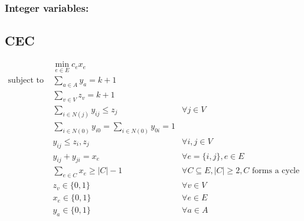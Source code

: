 \documentclass[11pt]{article}
\begin{document}
\subsubsection{Integer variables:}


\subsection{CEC}
\begin{subequations}
\begin{align}
 &\min_{e \in E} c_e x_e&  \\
\text{subject to }  &\sum_{a \in A} y_a = k+1& \\
 &\sum_{v \in V} z_v = k+1  \\
 &\sum_{i \in N(j)} y_{ij} \leq z_j  & \forall j \in V \\
 & \sum_{i \in N(0)}y_{i0} = \sum_{i \in N(0)} y_{0i}  = 1  \\
 & y_{ij} \leq z_i, z_j & \forall i,j \in V \\
 & y_{ij} + y_{ji} = x_e & \forall e=\{i,j\}, e \in E \\
 & \sum_{e \in C} x_e  \geq |C| - 1 & \forall C \subseteq E, |C| \geq 2, C\text{ forms a cycle} \\ 
 & z_v \in \{0,1\} & \forall v \in V \\
 & x_e \in \{0,1\} & \forall e \in E \\
 & y_a \in \{0,1\} & \forall a \in A 
\end{align}
\end{subequations}
\end{document}
